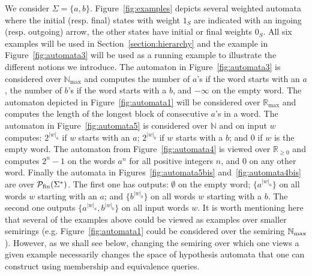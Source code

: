 \documentclass{lmcs}
\numberwithin{theorem}{section}
\begin{document}
\begin{exa}
We consider $\Sigma=\{a,b\}$. Figure~\ref{fig:examples} depicts several weighted automata where the initial (resp. final) states with weight $1_S$ are indicated with an ingoing (resp. outgoing) arrow, the other states have initial or final weights $0_S$. 
All six examples will be used in Section~\ref{section:hierarchy} and the example in Figure~\ref{fig:automata3} will be used as a running example to illustrate the different notions we introduce.
The automaton in Figure~\ref{fig:automata3} is considered over $\mathbb{N}_{\max}$ and computes the number of $a$'s if the word starts with an $a$, the number of $b$'s if the word starts with a $b$, and $-\infty$ on the empty word. The automaton depicted in Figure~\ref{fig:automata1} will be considered over $\mathbb{R}_{\max}$ and computes the length of the longest block of consecutive $a$'s in a word. The automaton in Figure~\ref{fig:automata5} is considered over $\mathbb{N}$ and on input $w$ computes: $2^{|w|_a}$  if $w$ starts with an $a$; $2^{|w|_b}$ if $w$ starts with a $b$; and $0$ if $w$ is the empty word. The automaton from Figure~\ref{fig:automata4} is viewed over $\mathbb{R}_{\geq 0}$ and computes $2^n - 1$ on the words $a^n$ for all positive integers $n$, and $0$ on any other word. Finally the automata in Figures~\ref{fig:automata5bis} and~\ref{fig:automata4bis} are over $\mathcal{P}_{\rm fin}(\Sigma^*)$. The first one has outputs: $\emptyset$ on the empty word; $\{a^{|w|_a}\}$ on all words $w$ starting with an $a$; and $\{b^{|w|_b}\}$ on all words $w$ starting with a $b$. The second one outputs $\{a^{|w|_a},b^{|w|_b}\}$ on all input words $w$. It is worth mentioning here that several of the examples above could be viewed as examples over smaller semirings (e.g. Figure~\ref{fig:automata1} could be considered over the semiring $\mathbb{N}_{\rm max}$). However, as we shall see below, changing the semiring over which one views a given example necessarily changes the space of hypothesis automata that one can construct using membership and equivalence queries. 
\end{exa}
\end{document}
